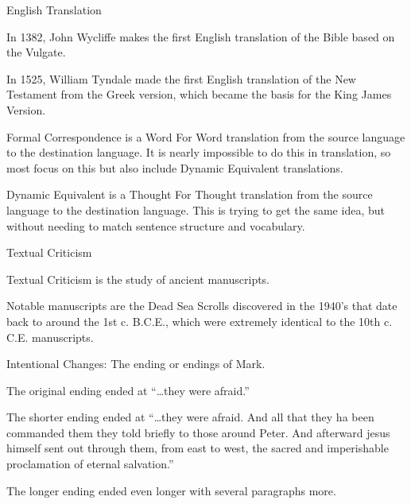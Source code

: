\documentclass{article}
\begin{document}
\centerline{English Translation}

    In 1382, John Wycliffe makes the first English translation of the Bible based on the Vulgate.

    In 1525, William Tyndale made the first English translation of the New Testament from the Greek version, which became the basis for the King James Version.
    
    Formal Correspondence is a Word For Word translation from the source language to the destination language. It is nearly impossible to do this in translation, so most focus on this but also include Dynamic Equivalent translations.

    Dynamic Equivalent is a Thought For Thought translation from the source language to the destination language. This is trying to get the same idea, but without needing to match sentence structure and vocabulary.

\centerline{Textual Criticism}

    Textual Criticism is the study of ancient manuscripts.

    Notable manuscripts are the Dead Sea Scrolls discovered in the 1940's that date back to around the 1st c. B.C.E., which were extremely identical to the 10th c. C.E. manuscripts.

    Intentional Changes: The ending or endings of Mark.

    The original ending ended at ``\ldots they were afraid.''

    The shorter ending ended at ``\ldots they were afraid. And all that they ha been commanded them they told briefly to those around Peter. And afterward jesus himself sent out through them, from east to west, the sacred and imperishable proclamation of eternal salvation.''

    The longer ending ended even longer with several paragraphs more.
\end{document}

